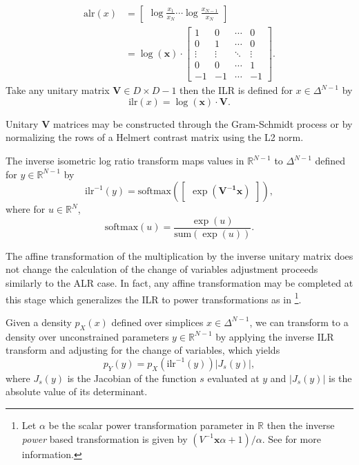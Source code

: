 \documentclass[11pt]{article}
\newcommand{\abs}[1]{\left| #1 \right|}
\newcommand{\absdet}[1]{\abs{#1}}
\begin{document}
\[
  \begin{aligned}
 \textrm{alr}(x) &= \begin{bmatrix}\displaystyle
    \log \frac{x_1}{x_N} \cdots \log \frac{x_{N-1}}{x_N}
  \end{bmatrix} \\
  &= \log(\mathbf{x}) \cdot \begin{bmatrix}\displaystyle
                    1 & 0 & \cdots & 0 \\
                    0 & 1 & \cdots & 0 \\
                    \vdots & \vdots & \ddots & \vdots \\
                    0 & 0 & \cdots & 1 \\
                    -1 & -1 & \cdots & -1
                    \end{bmatrix}.
  \end{aligned}
\]
Take any unitary matrix $\mathbf{V} \in D \times D - 1$ then the ILR is defined for $x \in \Delta^{N-1}$ by
\[
  \textrm{ilr}(x)
  = \log(\mathbf{x}) \cdot \mathbf{V}.
\]

Unitary $\mathbf{V}$ matrices may be constructed through the Gram-Schmidt process or by normalizing the rows of a Helmert contrast matrix using the L2 norm.

The inverse isometric log ratio transform maps values in
$\mathbb{R}^{N-1}$ to $\Delta^{N-1}$ defined for $y \in
\mathbb{R}^{N-1}$ by
\[
  \textrm{ilr}^{-1}(y)
  = \textrm{softmax}(\begin{bmatrix} \exp(\mathbf{V^{-1}} \mathbf{x} ) \end{bmatrix}),
\]
where for $u \in \mathbb{R}^N$,
\[
  \textrm{softmax}(u) = \frac{\exp(u)}{\textrm{sum}(\exp(u))}.
\]

The affine transformation of the multiplication by the inverse unitary matrix does not change
the calculation of the change of variables adjustment proceeds similarly to the ALR case. In fact, any affine transformation may be completed at this stage which generalizes the ILR to power transformations as in \cite{tsagris2011data}\footnote{
   Let $\alpha$ be the scalar power transformation parameter in $\mathbb{R}$ then the inverse \textit{power} based transformation is given by $(V^{-1} \mathbf{x} \alpha + 1) / \alpha$. See \cite{tsagris2011data} for more information.
}. 

Given a density $p_X(x)$ defined over simplices $x \in \Delta^{N-1}$,
we can transform to a density over unconstrained parameters $y \in
\mathbb{R}^{N-1}$ by applying the inverse ILR transform and adjusting
for the change of variables, which yields
\[
  p_Y(y) = p_X(\textrm{ilr}^{-1}(y)) \absdet{J_{s}(y)},
\]
where $J_{s}(y)$ is the Jacobian of the function $s$ evaluated at $y$
and $\absdet{J_s(y)}$ is the absolute value of its determinant.
\end{document}
